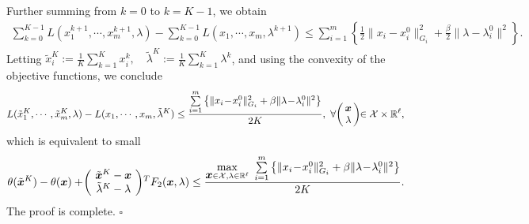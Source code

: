 \documentclass{mcom-l}
\theoremstyle{definition}
\theoremstyle{remark}
\numberwithin{equation}{section}
\begin{document}
Further summing from $k=0$ to $k=K-1$, we obtain
{\small\begin{eqnarray}
\sum\limits_{k=0}^{K-1} L(x_1^{k+1},\cdots,x_m^{k+1},\lambda) - \sum\limits_{k=0}^{K-1} L(x_1,\cdots,x_m,\lambda^{k+1})\le \sum\limits_{i=1}^m \left\{ \frac{1}{2} \| x_i - x_i^0 \|_{G_i}^2 + \frac{\beta}{2} \| \lambda - \lambda_i^0 \|^2 \right\}.\nonumber
\end{eqnarray}}
Letting $\tilde{x}_i^K := \frac{1}{K} \sum_{k=1}^K x_i^k,\quad \tilde{\lambda}^K := \frac{1}{K} \sum_{k=1}^K \lambda^k$, and using the convexity of the objective functions, we conclude
{\small$$
L(\tilde{x}_1^K,\cdots,\tilde{x}_m^K,\lambda) - L(x_1,\cdots,x_m,\tilde{\lambda}^K)\le \frac{\sum\limits_{i=1}^m \left\{ \| x_i \!-\! x_i^0 \|_{G_i}^2 + \beta \| \lambda \!-\! \lambda_i^0 \|^2 \right\}}{2K},\ \forall \!\left(\!\!\begin{array}{c} \mbox{\boldmath$x$}\\  \lambda \end{array}\!\!\right)\!\!\in {\mathcal{X}}\times{\mathbb{R}}^{\ell},
$$}
which is equivalent to
{small$$
\theta(\tilde{\mbox{\boldmath$x$}}^K) - \theta(\mbox{\boldmath$x$})
+ \!\left(\!\begin{array}{c}\tilde{{\mbox{\boldmath $x$}}}^K - \mbox{\boldmath$x$}\\ \tilde{\lambda}^K - \lambda \end{array}\!\right)\!^T F_2({{\mbox{\boldmath $x$}}},\lambda)\le \frac{\max\limits_{{{\mbox{\boldmath $x$}}}\in {\mathcal{X}},\lambda\in {\mathbb{R}}^{\ell} }\ \sum\limits_{i=1}^m \left\{ \| x_i \!-\! x_i^0 \|_{G_i}^2 + \beta \| \lambda \!-\! \lambda_i^0 \|^2 \right\}}{2K}.
$$}
The proof is complete. \hfill$\square$



\end{document}
